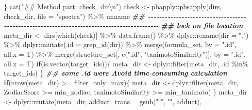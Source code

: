 \documentclass[
]{article}
\newenvironment{Shaded}{\begin{snugshade}}{\end{snugshade}}
\newcommand{\AttributeTok}[1]{\textcolor[rgb]{0.77,0.63,0.00}{#1}}
\newcommand{\ControlFlowTok}[1]{\textcolor[rgb]{0.13,0.29,0.53}{\textbf{#1}}}
\newcommand{\DocumentationTok}[1]{\textcolor[rgb]{0.56,0.35,0.01}{\textbf{\textit{#1}}}}
\newcommand{\FunctionTok}[1]{\textcolor[rgb]{0.00,0.00,0.00}{#1}}
\newcommand{\NormalTok}[1]{#1}
\newcommand{\OtherTok}[1]{\textcolor[rgb]{0.56,0.35,0.01}{#1}}
\newcommand{\SpecialCharTok}[1]{\textcolor[rgb]{0.00,0.00,0.00}{#1}}
\newcommand{\StringTok}[1]{\textcolor[rgb]{0.31,0.60,0.02}{#1}}
\begin{document}
\begin{Shaded}
\begin{Highlighting}[]
\NormalTok{    \}}
    \FunctionTok{cat}\NormalTok{(}\StringTok{"\#\# Method part: check\_dir}\SpecialCharTok{\textbackslash{}n}\StringTok{"}\NormalTok{)}
\NormalTok{    check }\OtherTok{\textless{}{-}}\NormalTok{ pbapply}\SpecialCharTok{::}\FunctionTok{pbsapply}\NormalTok{(dirs, check\_dir, }\AttributeTok{file =} \StringTok{"spectra"}\NormalTok{) }\SpecialCharTok{\%\textgreater{}\%}\NormalTok{ unname}
    \DocumentationTok{\#\# {-}{-}{-}{-}{-}{-}{-}{-}{-}{-}{-}{-}{-}{-}{-}{-}{-}{-}{-}{-}{-}{-}{-}{-}{-}{-}{-}{-}{-}{-}{-}{-}{-}{-}{-}{-}{-}{-}{-}{-}{-}{-}{-}{-}{-}{-}{-}{-}{-}{-}{-}{-}{-}{-}{-}{-}{-}{-}{-}{-}{-}{-}{-}{-}{-}{-}{-}{-}{-}{-}{-}{-}{-}{-}{-}{-}{-}{-}{-}{-}{-}{-}{-}{-}{-}{-}{-}{-}{-}{-}}
    \DocumentationTok{\#\# lock on file location}
\NormalTok{    meta\_dir }\OtherTok{\textless{}{-}}\NormalTok{ dirs[}\FunctionTok{which}\NormalTok{(check)] }\SpecialCharTok{\%\textgreater{}\%}
      \FunctionTok{data.frame}\NormalTok{() }\SpecialCharTok{\%\textgreater{}\%}
\NormalTok{      dplyr}\SpecialCharTok{::}\FunctionTok{rename}\NormalTok{(}\AttributeTok{dir =} \StringTok{"."}\NormalTok{) }\SpecialCharTok{\%\textgreater{}\%}
\NormalTok{      dplyr}\SpecialCharTok{::}\FunctionTok{mutate}\NormalTok{(}\AttributeTok{.id =} \FunctionTok{grep\_id}\NormalTok{(dir)) }\SpecialCharTok{\%\textgreater{}\%}
      \FunctionTok{merge}\NormalTok{(formula\_set, }\AttributeTok{by =} \StringTok{".id"}\NormalTok{, }\AttributeTok{all.x =}\NormalTok{ T) }\SpecialCharTok{\%\textgreater{}\%}
      \FunctionTok{merge}\NormalTok{(structure\_set[, }\FunctionTok{c}\NormalTok{(}\StringTok{".id"}\NormalTok{, }\StringTok{"tanimotoSimilarity"}\NormalTok{)], }\AttributeTok{by =} \StringTok{".id"}\NormalTok{, }\AttributeTok{all.x =}\NormalTok{ T)}
    \ControlFlowTok{if}\NormalTok{(}\FunctionTok{is.vector}\NormalTok{(target\_ids))\{}
\NormalTok{      meta\_dir }\OtherTok{\textless{}{-}}\NormalTok{ dplyr}\SpecialCharTok{::}\FunctionTok{filter}\NormalTok{(meta\_dir, .id }\SpecialCharTok{\%in\%}\NormalTok{ target\_ids)}
\NormalTok{    \}}
    \DocumentationTok{\#\# some .id were Avoid time{-}consuming calculation}
    \ControlFlowTok{if}\NormalTok{(}\FunctionTok{nrow}\NormalTok{(meta\_dir) }\SpecialCharTok{\textgreater{}=}\NormalTok{ filter\_only\_max)\{}
\NormalTok{      meta\_dir }\OtherTok{\textless{}{-}}\NormalTok{ dplyr}\SpecialCharTok{::}\FunctionTok{filter}\NormalTok{(meta\_dir, ZodiacScore }\SpecialCharTok{\textgreater{}=}\NormalTok{ min\_zodiac, tanimotoSimilarity }\SpecialCharTok{\textgreater{}=}\NormalTok{ min\_tanimoto)}
\NormalTok{    \}}
\NormalTok{    meta\_dir }\OtherTok{\textless{}{-}}\NormalTok{ dplyr}\SpecialCharTok{::}\FunctionTok{mutate}\NormalTok{(meta\_dir, }\AttributeTok{adduct\_trans =} \FunctionTok{gsub}\NormalTok{(}\StringTok{" "}\NormalTok{, }\StringTok{""}\NormalTok{, adduct),}

\end{Highlighting}
\end{Shaded}
\end{document}
